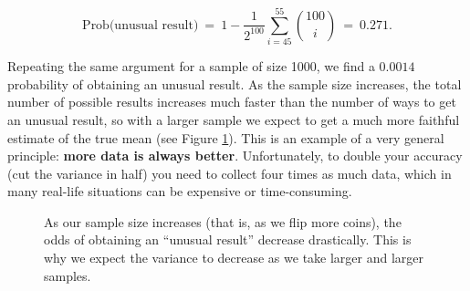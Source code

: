 \begin{equation*}

\textrm{Prob(unusual result)} \ = \  1-\frac{1}{2^{100}}\sum_{i=45}^{55}{100 \choose i}\ = \ 0.271.

\end{equation*}



Repeating the same argument for a sample of size 1000, we find a $0.0014$ probability of obtaining an unusual result.  As the sample size increases, the total number of possible results increases much faster than the number of ways to get an unusual result, so with a larger sample we expect to get a much more faithful estimate of the true mean (see Figure \ref{fig:unusualresults}).  This is an example of a very general principle: \textbf{more data is always better}. Unfortunately, to double your accuracy (cut the variance in half) you need to collect four times as much data, which in many real-life situations can be expensive or time-consuming.



\begin{figure}[h!]

\begin{center}


\caption{\label{fig:unusualresults} As our sample size increases (that is, as we flip more coins), the odds of obtaining an ``unusual result'' decrease drastically.  This is why we expect the variance to decrease as we take larger and larger samples.}

\end{center}

\end{figure}



\begin{comment}{

temp = {};

For[n = 100, n <= 1000, n = n + 10,

 temp = AppendTo[

   temp, {n, 1 - Sum[Binomial[n, i], {i, .45 n, .55 n}]/2^n}]]

ListPlot[temp, AxesLabel -> {"Number of flips", "Probability"},

 PlotRange -> {{100, 1000}, {0, .3}},

 PlotLabel -> "Probability of getting an unusual result"]

}\end{comment}



